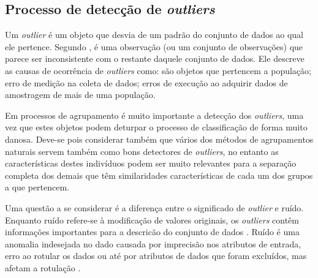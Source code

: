 \begin{figure}[!ht]
	\centering
\end{figure}

\subsection{Processo de detecção de \textit{outliers}}

Um \textit{outlier} é um objeto que desvia de um padrão do conjunto de dados ao qual ele pertence. Segundo \cite{Barnett1978Outliers}, é uma observação (ou um conjunto de observações) que parece ser inconsistente com o restante daquele conjunto de dados. Ele descreve as causas de ocorrência de \textit{outliers} como: são objetos que pertencem a população; erro de medição na coleta de dados; erros de execução ao adquirir dados de amostragem de mais de uma população.

Em processos de agrupamento é muito importante a detecção dos \textit{outliers}, uma vez que estes objetos podem deturpar o processo de classificação de forma muito danosa. Deve-se pois considerar também que vários dos métodos de agrupamentos naturais servem também como bons detectores de \textit{outliers}, no entanto as características destes indivíduos podem ser muito relevantes para a separação completa dos demais que têm similaridades características de cada um dos grupos a que pertencem.

Uma questão a se considerar é a diferença entre o significado de \textit{outlier} e ruído. Enquanto ruído refere-se à modificação de valores originais, os \textit{outliers} contêm informações importantes para a descricão do conjunto de dados \cite{chandola2009}. Ruído é uma anomalia indesejada no dado causada por imprecisão nos atributos de entrada, erro ao rotular os dados ou até por atributos de dados que foram excluídos, mas afetam a rotulação \cite{alpaydin2010}.


